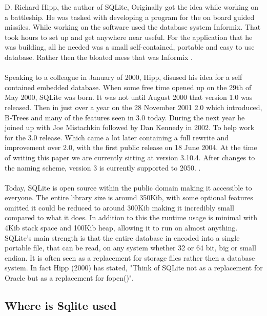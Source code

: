 D. Richard Hipp, the author of SQLite, Originally got the idea while working on a battleship. He was tasked with developing a program for the on board guided missiles. While working on the software used the database system Informix. That took hours to set up and get anywhere near useful. For the application that he was building, all he needed was a small self-contained, portable and easy to use database. Rather then the bloated mess that was Informix \citep{sqlitedefguide}.
\\\\
Speaking to a colleague in January of 2000, Hipp, disused his idea for a self contained embedded database. When some free time opened up on the 29th of May 2000, SQLite was born. It was not until August 2000 that version 1.0 was released. Then in just over a year on the 28 November 2001 2.0 which introduced, B-Trees and many of the features seen in 3.0 today. During the next year he joined up with Joe Mistachkin followed by Dan Kennedy in 2002. To help work for the 3.0 release. Which came a lot later containing a full rewrite and improvement over 2.0, with the first public release on 18 June 2004. At the time of writing this paper we are currently sitting at version 3.10.4. After changes to the naming scheme, version 3 is currently supported to 2050. \citep{sqlite}.
\\\\
Today, SQLite is open source within the public domain making it accessible to everyone. The entire library size is around 350Kib, with some optional features omitted it could be reduced to around 300Kib making it incredibly small compared to what it does. In addition to this the runtime usage is minimal with 4Kib stack space and 100Kib heap, allowing it to run on almost anything. SQLite's main strength is that the entire database in encoded into a single portable file, that can be read, on any system whether 32 or 64 bit, big or small endian. It is often seen as a replacement for storage files rather then a database system. In fact Hipp (2000) has stated, "Think of SQLite not as a replacement for Oracle but as a replacement for fopen()".

\subsection{Where is Sqlite used}
\label{subsec:where_is_sqlite}

